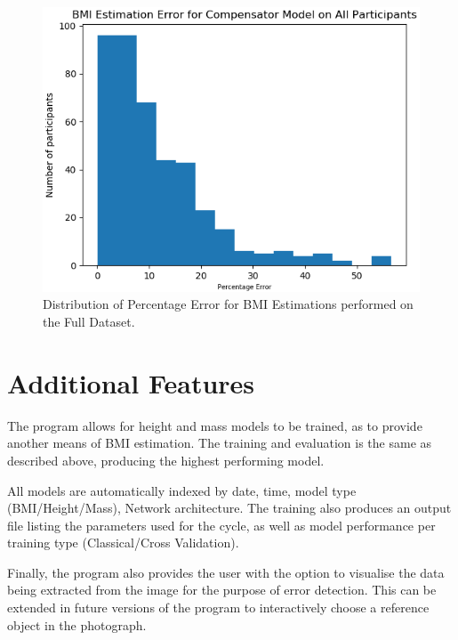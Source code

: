 \documentclass[conference]{IEEEtran}
\begin{document}
\begin{figure}
	\centering
	\includegraphics[width=0.7\linewidth]{errorspread.png}
	\caption{Distribution of Percentage Error for BMI Estimations performed on the Full Dataset.}
	\label{fig:errorspread}
\end{figure}

\section{Additional Features}
The program allows for height and mass models to be trained, as to provide another means of BMI estimation.
The training and evaluation is the same as described above, producing the highest performing model.

All models are automatically indexed by date, time, model type (BMI/Height/Mass), Network architecture.
The training also produces an output file listing the parameters used for the cycle, as well as model performance per training type (Classical/Cross Validation).

Finally, the program also provides the user with the option to visualise the data being extracted from the image for the purpose of error detection.
This can be extended in future versions of the program to interactively choose a reference object in the photograph.
\end{document}
